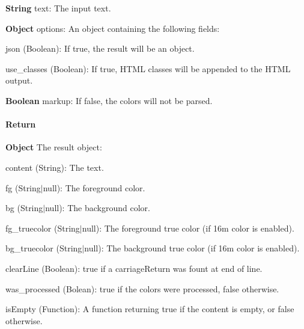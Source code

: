 \begin{DoxyItemize}
\item {\bfseries String} {\ttfamily text}\+: The input text.
\item {\bfseries Object} {\ttfamily options}\+: An object containing the following fields\+:
\begin{DoxyItemize}
\item {\ttfamily json} (Boolean)\+: If {\ttfamily true}, the result will be an object.
\item {\ttfamily use\+\_\+classes} (Boolean)\+: If {\ttfamily true}, H\+T\+ML classes will be appended to the H\+T\+ML output.
\end{DoxyItemize}
\item {\bfseries Boolean} {\ttfamily markup}\+: If false, the colors will not be parsed.
\end{DoxyItemize}

\paragraph*{Return}


\begin{DoxyItemize}
\item {\bfseries Object} The result object\+:
\begin{DoxyItemize}
\item {\ttfamily content} (String)\+: The text.
\item {\ttfamily fg} (String$\vert$null)\+: The foreground color.
\item {\ttfamily bg} (String$\vert$null)\+: The background color.
\item {\ttfamily fg\+\_\+truecolor} (String$\vert$null)\+: The foreground true color (if 16m color is enabled).
\item {\ttfamily bg\+\_\+truecolor} (String$\vert$null)\+: The background true color (if 16m color is enabled).
\item {\ttfamily clear\+Line} (Boolean)\+: {\ttfamily true} if a carriage\+Return  was fount at end of line.
\item {\ttfamily was\+\_\+processed} (Bolean)\+: {\ttfamily true} if the colors were processed, {\ttfamily false} otherwise.
\item {\ttfamily is\+Empty} (Function)\+: A function returning {\ttfamily true} if the content is empty, or {\ttfamily false} otherwise.
\end{DoxyItemize}
\end{DoxyItemize}


